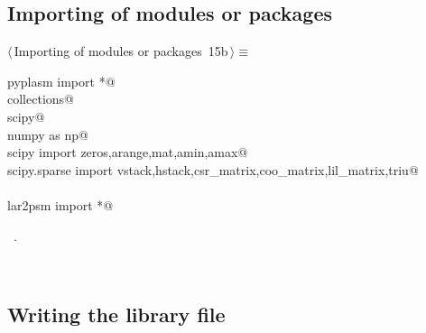 \documentclass[11pt,oneside]{article}	%
\begin{document}
\subsection{Importing of modules or packages}
\begin{flushleft} \small
\begin{minipage}{\linewidth} \label{scrap29}
\protect{}$\langle\,$Importing of modules or packages\nobreak\ {\footnotesize 15b}$\,\rangle\equiv$
\vspace{-1ex}
\begin{list}{}{} \item
\mbox{}\verb@from pyplasm import *@\\
\mbox{}\verb@import collections@\\
\mbox{}\verb@import scipy@\\
\mbox{}\verb@import numpy as np@\\
\mbox{}\verb@from scipy import zeros,arange,mat,amin,amax@\\
\mbox{}\verb@from scipy.sparse import vstack,hstack,csr_matrix,coo_matrix,lil_matrix,triu@\\
\mbox{}\verb@@\\
\mbox{}\verb@from lar2psm import *@\\
\mbox{}\verb@@{\NWsep}
\end{list}
\vspace{-1ex}
\footnotesize\addtolength{\baselineskip}{-1ex}
\begin{list}{}{\setlength{\itemsep}{-\parsep}\setlength{\itemindent}{-\leftmargin}}
\item \NWtxtMacroRefIn\ .
\end{list}
\end{minipage}\\[4ex]
\end{flushleft}

\subsection{Writing the library file}
\end{document}
